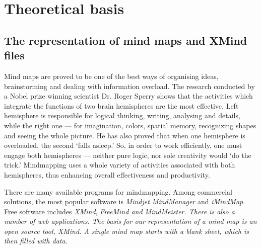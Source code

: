 %
%
%
%
%

\chapter{Theoretical basis}
\label{chap:theory}

\section{The representation of mind maps and XMind files}
\label{sec:xmind}

Mind maps are proved to be one of the best ways of organising ideas, brainstorming and dealing with information overload. The research conducted by a Nobel prize winning scientist Dr. Roger Sperry shows that the activities which integrate the functions of two brain hemispheres are the most effective. Left hemisphere is responsible for logical thinking, writing, analysing and details, while the right one --- for imagination, colors, spatial memory, recognizing shapes and seeing the whole picture. He has also proved that when one hemisphere is overloaded, the second `falls asleep.' So, in order to work efficiently, one must engage both hemispheres --- neither pure logic, nor sole creativity would `do the trick.' Mindmapping uses a whole variety of activities associated with both hemispheres, thus enhancing overall effectiveness and productivity.

There are many available programs for mindmapping. Among commercial solutions, the most popular software is {\em Mindjet MindManager} and {\em iMindMap}. Free software includes {\em XMind}, \em{FreeMind} and \em{MindMeister}. There is also a number of web applications. The basis for our representation of a mind map is an open source tool, {\em XMind}. A single mind map starts with a blank sheet, which is then filled with data.

